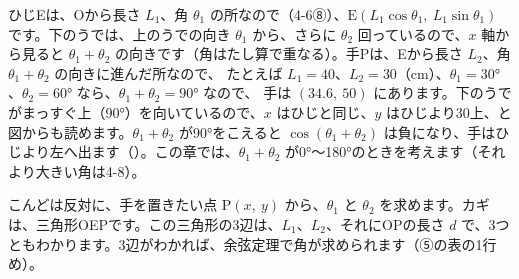 ひじEは、Oから長さ $L_1$、角 $\theta_1$ の所なので（4-6⑧）、$\mathrm{E}(L_1\cos\theta_1,\ L_1\sin\theta_1)$ です。下のうでは、上のうでの向き $\theta_1$ から、さらに $\theta_2$ 回っているので、$x$ 軸から見ると $\theta_1+\theta_2$ の向きです（角はたし算で重なる）。手Pは、Eから長さ $L_2$、角 $\theta_1+\theta_2$ の向きに進んだ所なので、
たとえば $L_1=40$、$L_2=30$（cm）、$\theta_1=\ang{30}$、$\theta_2=\ang{60}$ なら、$\theta_1+\theta_2=\ang{90}$ なので、
手は $(34.6,\ 50)$ にあります。下のうでがまっすぐ上（\ang{90}）を向いているので、$x$ はひじと同じ、$y$ はひじより30上、と図からも読めます。$\theta_1+\theta_2$ が\ang{90}をこえると $\cos(\theta_1+\theta_2)$ は負になり、手はひじより左へ出ます（）。この章では、$\theta_1+\theta_2$ が\ang{0}〜\ang{180}のときを考えます（それより大きい角は4-8）。

こんどは反対に、手を置きたい点 $\mathrm{P}(x,\ y)$ から、$\theta_1$ と $\theta_2$ を求めます。カギは、三角形OEPです。この三角形の3辺は、$L_1$、$L_2$、それにOPの長さ $d$ で、3つともわかります。3辺がわかれば、余弦定理で角が求められます（⑤の表の1行め）。

